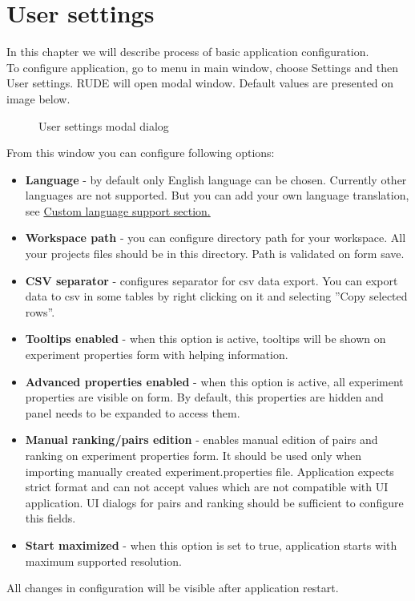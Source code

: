 \section{User settings}\label{section:user-settings}

In this chapter we will describe process of basic application configuration.\\

To configure application, go to menu in main window, choose Settings and then User settings. RUDE will open modal window. Default values are presented on image below.

\begin{figure*}[!ht] 
	\centering
	\caption{User settings modal dialog}
\end{figure*}


From this window you can configure following options:
\begin{itemize}
	\item \textbf{Language} - by default only English language can be chosen. Currently other languages are not supported. But you can add your own language translation, see \hyperref[sub:config-labels]{Custom language support section.}
	\item \textbf{Workspace path} - you can configure directory path for your workspace. All your projects files should be in this directory. Path is validated on form save.
	\item \textbf{CSV separator} - configures separator for csv data export. You can export data to csv in some tables by right clicking on it and selecting ''Copy selected rows''.
	\item \textbf{Tooltips enabled} - when this option is active, tooltips will be shown on experiment properties form with helping information.
	\item \textbf{Advanced properties enabled} - when this option is active, all experiment properties are visible on form. By default, this properties are hidden and panel needs to be expanded to access them.
	\item \textbf{Manual ranking/pairs edition} - enables manual edition of pairs and ranking on experiment properties form. It should be used only when importing manually created experiment.properties file. Application expects strict format and can not accept values which are not compatible with UI application. UI dialogs for pairs and ranking should be sufficient to configure this fields.
	\item \textbf{Start maximized} - when this option is set to true, application starts with maximum supported resolution.
\end{itemize}

All changes in configuration will be visible after application restart.


\vfill\newpage